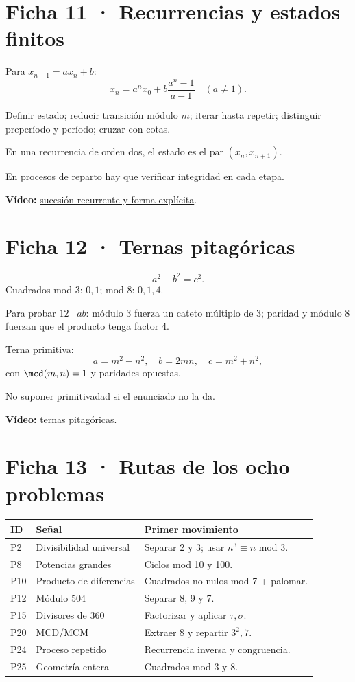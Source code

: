 \documentclass[10pt,a4paper,openany]{report}
\begin{document}
\section*{Ficha 11 · Recurrencias y estados finitos}
Para $x_{n+1}=ax_n+b$:
\[
x_n=a^nx_0+b\frac{a^n-1}{a-1}\quad(a\ne1).
\]
\begin{procedimiento}
Definir estado; reducir transición módulo $m$; iterar hasta repetir; distinguir preperíodo y período; cruzar con cotas.
\end{procedimiento}
En una recurrencia de orden dos, el estado es el par $(x_n,x_{n+1})$.
\begin{alerta}En procesos de reparto hay que verificar integridad en cada etapa.\end{alerta}
\textbf{Vídeo:} \href{https://www.youtube.com/watch?v=TqVx4InC3NE}{sucesión recurrente y forma explícita}.
\clearpage

\section*{Ficha 12 · Ternas pitagóricas}
\[
a^2+b^2=c^2.
\]
Cuadrados mod 3: $0,1$; mod 8: $0,1,4$.
\begin{ruta}
Para probar $12\mid ab$: módulo 3 fuerza un cateto múltiplo de 3; paridad y módulo 8 fuerzan que el producto tenga factor 4.
\end{ruta}
Terna primitiva:
\[
a=m^2-n^2,\quad b=2mn,\quad c=m^2+n^2,
\]
con $\mcd(m,n)=1$ y paridades opuestas.
\begin{alerta}No suponer primitivadad si el enunciado no la da.\end{alerta}
\textbf{Vídeo:} \href{https://www.youtube.com/watch?v=c3jFerYqGok}{ternas pitagóricas}.
\clearpage

\section*{Ficha 13 · Rutas de los ocho problemas}
\begin{tabularx}{\textwidth}{C{1cm}L{3.2cm}Y}
\toprule ID & Señal & Primer movimiento\\\midrule
P2&Divisibilidad universal&Separar 2 y 3; usar $n^3\equiv n$ mod 3.\\
P8&Potencias grandes&Ciclos mod 10 y 100.\\
P10&Producto de diferencias&Cuadrados no nulos mod 7 + palomar.\\
P12&Módulo 504&Separar 8, 9 y 7.\\
P15&Divisores de 360&Factorizar y aplicar $\tau,\sigma$.\\
P20&MCD/MCM&Extraer 8 y repartir $3^2,7$.\\
P24&Proceso repetido&Recurrencia inversa y congruencia.\\
P25&Geometría entera&Cuadrados mod 3 y 8.\\
\bottomrule
\end{tabularx}
\clearpage
\end{document}
